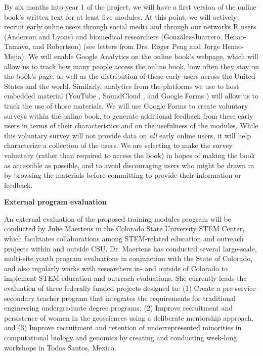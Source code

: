 \documentclass[pdftex,english,11.5pt,parskip=half]{scrartcl}
\begin{document}
By six months into year 1 of the project, we will 
have a first version of the online book's written text for at least five 
modules. At this point, we will actively recruit early online users through
social media and through our networks R users (Anderson and Lyons) and biomedical researchers (Gonzalez-Juarrero, Henao-Tamayo, and Robertson) (see letters from Drs. Roger Peng and Jorge Henao-Mejia). We will enable Google Analytics \cite{googleanalytics} on the online book's webpage, which will allow us to track how many people 
access the online book, how often they stay on the book's page, as well as the distribution of these early users across the United States and the world. 
Similarly, analytics from the platforms we use to host embedded material (YouTube \cite{youtube},
SoundCloud \cite{soundcloud}, and Google Forms \cite{googleforms}) will allow us to track the use of those materials.
We will use Google Forms \cite{googleforms} to create voluntary surveys within the online book, to generate additional feedback from these early users in terms of their characteristics and on the usefulness of the modules.  While this voluntary survey will not provide data on \textit{all} early online users, it will help characterize a collection of the users. We are selecting to make the survey voluntary (rather than required to access the book) in hopes of making the book as accessible as possible, and to avoid discouraging users who might be drawn in by browsing the materials before committing to provide their information or feedback.

\textbf{External program evaluation}

An external evaluation of the proposed training modules program will be conducted by Julie Maertens in the Colorado State University STEM Center, which facilitates collaborations among STEM-related education and outreach projects within and outside CSU. Dr. Maertens has conducted several large-scale, multi-site youth program evaluations in conjunction with the State of Colorado, and also regularly works with researchers in- and outside of Colorado to implement STEM education and outreach evaluations. She currently leads the evaluation of three federally funded projects designed to: (1) Create a pre-service secondary teacher program that integrates the requirements for traditional engineering undergraduate degree programs; (2) Improve recruitment and persistence of women in the geosciences using a deliberate mentorship approach, and (3) Improve recruitment and retention of underrepresented minorities in computational biology and genomics by creating and conducting week-long workshops in Todos Santos, Mexico.
\end{document}
